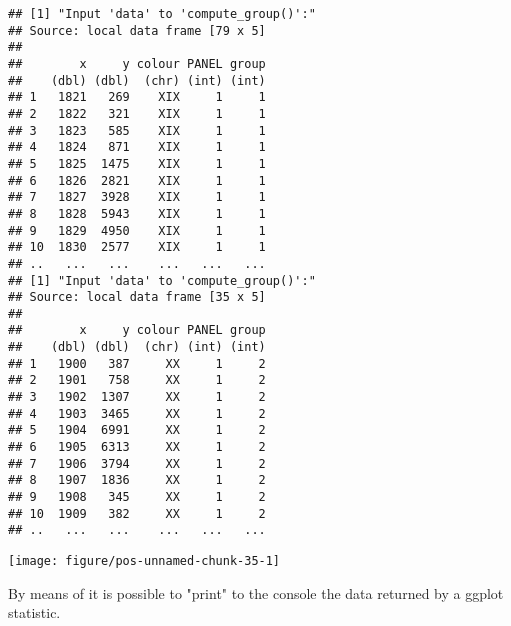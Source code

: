 \documentclass[paper=a4,10pt,div=17,headsepline,BCOR=12mm,twoside,open=right]{scrbook}\usepackage{knitr}
\begin{document}
\begin{knitrout}\footnotesize
{}\color{fgcolor}\begin{kframe}
\begin{alltt}
\hlopt{$} \hlkwb{<-} \hlopt{$} \hlopt{>=} \hlstd{,} \hlstd{,} \hlstd{)}
    \hlopt{+}
  \hlstd{()} \hlopt{+}
  \hlstd{()}
\end{alltt}
\begin{verbatim}
## [1] "Input 'data' to 'compute_group()':"
## Source: local data frame [79 x 5]
## 
##        x     y colour PANEL group
##    (dbl) (dbl)  (chr) (int) (int)
## 1   1821   269    XIX     1     1
## 2   1822   321    XIX     1     1
## 3   1823   585    XIX     1     1
## 4   1824   871    XIX     1     1
## 5   1825  1475    XIX     1     1
## 6   1826  2821    XIX     1     1
## 7   1827  3928    XIX     1     1
## 8   1828  5943    XIX     1     1
## 9   1829  4950    XIX     1     1
## 10  1830  2577    XIX     1     1
## ..   ...   ...    ...   ...   ...
## [1] "Input 'data' to 'compute_group()':"
## Source: local data frame [35 x 5]
## 
##        x     y colour PANEL group
##    (dbl) (dbl)  (chr) (int) (int)
## 1   1900   387     XX     1     2
## 2   1901   758     XX     1     2
## 3   1902  1307     XX     1     2
## 4   1903  3465     XX     1     2
## 5   1904  6991     XX     1     2
## 6   1905  6313     XX     1     2
## 7   1906  3794     XX     1     2
## 8   1907  1836     XX     1     2
## 9   1908   345     XX     1     2
## 10  1909   382     XX     1     2
## ..   ...   ...    ...   ...   ...
\end{verbatim}
\end{kframe}

{\centering \texttt{[image: figure/pos-unnamed-chunk-35-1]} 

}



\end{knitrout}

By means of  it is possible to "print" to the console the data returned by a ggplot statistic.
\end{document}
